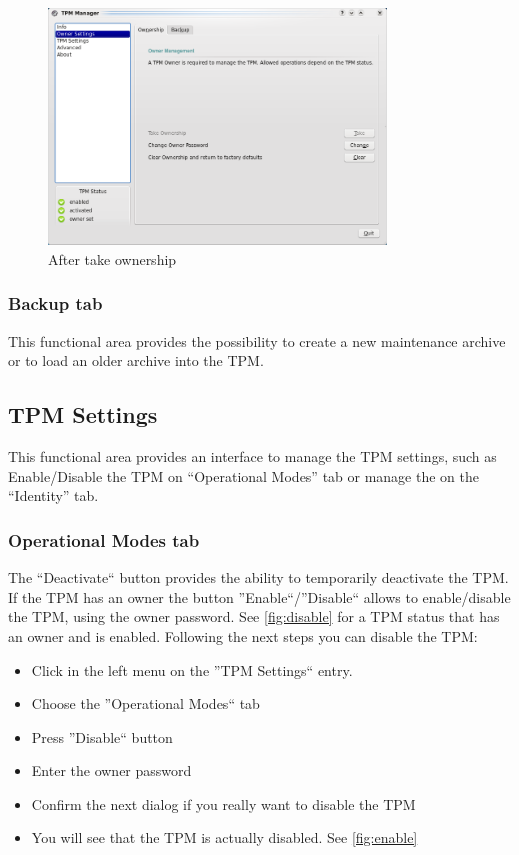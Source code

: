 \documentclass[
  american        %
]{sirrixreport}
\begin{document}
\begin{figure}[h]
 \centering
   \includegraphics[width=0.8\textwidth]{images/tpm_ownership}
   \caption{After take ownership}
\label{fig:take2}
\end{figure}
\clearpage
\subsubsection{Backup tab} This functional area provides the possibility to create a new maintenance archive or to load an older archive into the TPM.

\subsection{TPM Settings} This functional area provides an interface to manage the TPM settings, such as Enable/Disable the TPM on ``Operational Modes'' tab or manage the \EK on the ``Identity'' tab.
   \subsubsection{Operational Modes tab} The ``Deactivate`` button provides the ability to temporarily deactivate the TPM. If the TPM has an owner the button ''Enable``/''Disable`` allows to enable/disable the TPM, using the owner password. See \autoref{fig:disable} for a TPM status that has an owner and is enabled. Following the next steps you can disable the TPM:

\begin{itemize}
   \item Click in the left menu on the ''TPM Settings`` entry.
   \item Choose the ''Operational Modes`` tab
   \item Press ''Disable`` button
   \item Enter the owner password
   \item Confirm the next dialog if you really want to disable the TPM
   \item You will see that the TPM is actually disabled. See \autoref{fig:enable}
\end{itemize}
\end{document}
